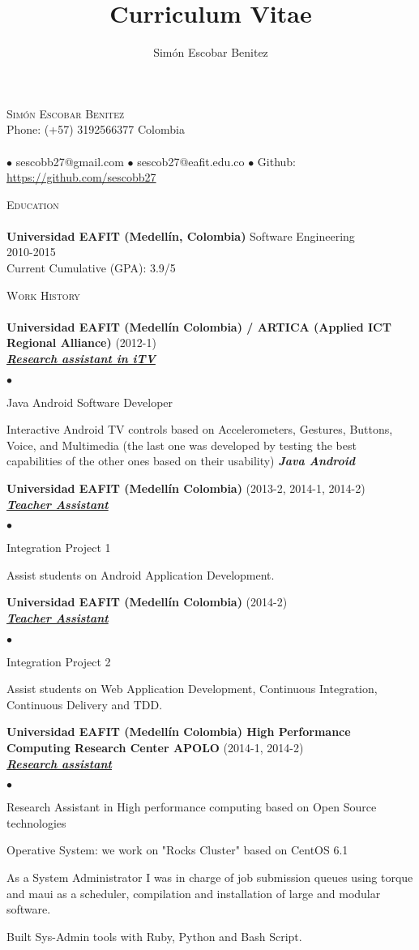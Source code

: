 \documentclass[a4paper]{article}
\title{Curriculum Vitae}
\author{Sim\'on Escobar Benitez}
\newcommand{\lineunder}{\vspace*{-8pt} \\ \hspace*{-18pt} \hrulefill \\}
\newcommand{\header}[1]{{\hspace*{-15pt}\vspace*{6pt}
\textsc{#1}} \vspace*{-6pt} \lineunder}
\newcommand{\employer}[3]{{
\textbf{#1} (#2)\\ \underline{\textbf{\emph{#3}}}\\ }}
\newcommand{\contact}[3]{
\vspace*{-8pt}
\begin{center}
{\LARGE \scshape {#1}}\\ #2 \lineunder #3
\end{center}
\vspace*{-8pt} }
\newenvironment{achievements}{\begin{list}{$\bullet$}{\topsep 0pt \itemsep
-2pt}}{\vspace*{4pt}\end{list}}
\newcommand{\schoolwithcourses}[4]{
\textbf{#1} #2 \\ #3\\ #4\\
\vspace*{5pt} }
\newcommand{\emphasys}[1]{\textbf{\emph{#1}}}
\begin{document}
\small
\smallskip
\vspace*{-44pt}
\contact{Sim\'on Escobar Benitez} { Phone: (+57) 3192566377 Colombia } { $\bullet$ sescobb27@gmail.com $\bullet$ sescob27@eafit.edu.co $\bullet$ Github: \url{https://github.com/sescobb27} }
\header{Education}
\schoolwithcourses{Universidad EAFIT (Medell\'in, Colombia)}{Software Engineering} {2010-2015} {Current Cumulative (GPA): 3.9/5}

\header{Work History}

\employer{ Universidad EAFIT (Medell\'in Colombia) / ARTICA (Applied ICT Regional Alliance)} {2012-1} {Research assistant in iTV}
\begin{achievements}
\item Java Android Software Developer
\item Interactive Android TV controls based on Accelerometers, Gestures, Buttons, Voice, and Multimedia (the last one was developed by testing the best capabilities of the other ones based on their usability) \emphasys{Java Android}
\end{achievements}

\employer{ Universidad EAFIT (Medell\'in Colombia) }{2013-2, 2014-1, 2014-2}{Teacher Assistant}
\begin{achievements}
\item Integration Project 1
\item Assist students on Android Application Development.
\end{achievements}

\employer{ Universidad EAFIT (Medell\'in Colombia) }{2014-2}{Teacher Assistant}
\begin{achievements}
\item Integration Project 2
\item Assist students on Web Application Development, Continuous Integration, Continuous Delivery and TDD.
\end{achievements}

\employer{ Universidad EAFIT (Medell\'in Colombia) High Performance Computing Research Center APOLO}{2014-1, 2014-2}{Research assistant}
\begin{achievements}
\item Research Assistant in High performance computing based on Open Source technologies
\item Operative System: we work on "Rocks Cluster" based on CentOS 6.1
\item As a System Administrator I was in charge of job submission queues using torque and maui as a scheduler, compilation and installation of large and modular software.
\item Built Sys-Admin tools with Ruby, Python and Bash Script.
\end{achievements}
\end{document}
